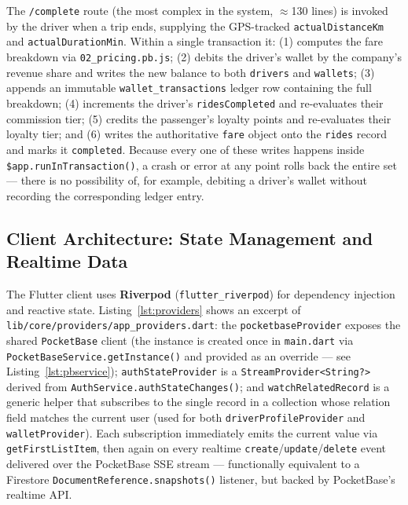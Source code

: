 \documentclass[11pt,a4paper]{article}
\begin{document}
The \texttt{/complete} route (the most complex in the system, $\approx$130
lines) is invoked by the driver when a trip ends, supplying the
GPS-tracked \texttt{actualDistanceKm} and \texttt{actualDurationMin}. Within a
single transaction it: (1) computes the fare breakdown via
\texttt{02\_pricing.pb.js}; (2) debits the driver's wallet by the company's
revenue share and writes the new balance to both \texttt{drivers} and
\texttt{wallets}; (3) appends an immutable \texttt{wallet\_transactions} ledger
row containing the full breakdown; (4) increments the driver's
\texttt{ridesCompleted} and re-evaluates their commission tier; (5) credits
the passenger's loyalty points and re-evaluates their loyalty tier; and (6)
writes the authoritative \texttt{fare} object onto the \texttt{rides} record and
marks it \texttt{completed}. Because every one of these writes happens inside
\texttt{\$app.runInTransaction()}, a crash or error at any point rolls back the
entire set --- there is no possibility of, for example, debiting a driver's
wallet without recording the corresponding ledger entry.

\subsection{Client Architecture: State Management and Realtime Data}
\label{sec:client-state}

The Flutter client uses \textbf{Riverpod} (\texttt{flutter\_riverpod}) for
dependency injection and reactive state. Listing~\ref{lst:providers} shows
an excerpt of \texttt{lib/core/providers/app\_providers.dart}: the
\texttt{pocketbaseProvider} exposes the shared \texttt{PocketBase} client (the
instance is created once in \texttt{main.dart} via
\texttt{PocketBaseService.getInstance()} and provided as an override --- see
Listing~\ref{lst:pbservice}); \texttt{authStateProvider} is a
\texttt{StreamProvider<String?>} derived from
\texttt{AuthService.authStateChanges()}; and \texttt{watchRelatedRecord} is a
generic helper that subscribes to the single record in a collection whose
relation field matches the current user (used for both
\texttt{driverProfileProvider} and \texttt{walletProvider}). Each subscription
immediately emits the current value via \texttt{getFirstListItem}, then again
on every realtime \texttt{create}/\texttt{update}/\texttt{delete} event delivered
over the PocketBase SSE stream --- functionally equivalent to a Firestore
\texttt{DocumentReference.snapshots()} listener, but backed by PocketBase's
realtime API.
\end{document}
